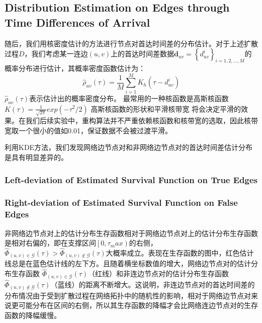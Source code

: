 \documentclass[journal]{IEEEtran}
\begin{document}
{		\subsection{Distribution Estimation on Edges through Time Differences of Arrival}
		随后，我们用核密度估计的方法进行节点对首达时间差的分布估计。对于上述扩散过程$D$，我们考虑某一连边$(u,v)$上的首达时间差数据$\bm{d}_{uv}=\left\{d_{uv}^i \right\}_{i=1,2,\ldots,M}$的概率分布进行估计，其概率密度函数估计为：
		$$\hat{\rho}_{uv}(\tau)=\frac{1}{M}\sum_{i=1}^MK_h(\tau- d_{uv}^i)$$
		$\hat{\rho}_{uv}(\tau)$表示估计出的概率密度分布。
		最常用的一种核函数是高斯核函数$K(\tau)=\frac{1}{\sqrt{2\pi}}exp(-\tau ^2 /2)$
		高斯核函数的形状和平滑核带宽 将会决定平滑的效果。在我们后续实验中，重构算法并不严重依赖核函数和核带宽的选取，因此核带宽取一个很小的值如0.01，保证数据不会被过渡平滑。
		
		利用KDE方法，我们发现网络边节点对和非网络边节点对的首达时间差估计分布是具有明显差异的。
		\subsubsection{Left-deviation of Estimated Survival Function on True Edges}

		
		\subsubsection{Right-deviation of Estimated Survival Function on False Edges}
		非网络边节点对上的估计分布生存函数相对于网络边节点对上的估计分布生存函数是相对右偏的，即在支撑区间$\left[0,\tau_max\right)$的右侧，$\hat{\Phi}_{(u,v)\in \mathcal{G}}(\tau)> \hat{\Phi}_{(u,v)\notin \mathcal{G}}(\tau)$大概率成立。表现在生存函数的图中，红色估计线总是在蓝色估计线的左下方。且随着横坐标数值的增大，网络边节点对的估计分布生存函数 $\hat{\Phi}_{(u,v)\in \mathcal{G}}(\tau)$（红线）和非连边节点对的估计分布生存函数$\hat{\Phi}_{(u,v)\notin \mathcal{G}}(\tau)$（蓝线）的距离不断增大。这说明，非连边节点对的首达时间差的分布情况由于受到扩散过程在网络拓扑中的随机性的影响，相对于网络边节点对来说更可能分布在区间的右侧，所以其生存函数的降幅才会比网络连边节点对的生存函数的降幅缓慢。
}
\end{document}
